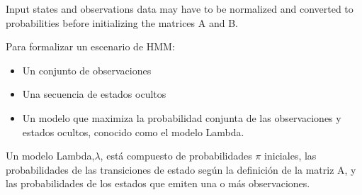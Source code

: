 Input states and observations data may have to be normalized and converted to probabilities before initializing the matrices A and B.




Para formalizar un escenario de HMM:

\begin{itemize}
	\item Un conjunto de observaciones
	\item Una secuencia de estados ocultos
	\item Un modelo que maximiza la probabilidad conjunta de las observaciones y estados ocultos, conocido como el modelo Lambda.

\end{itemize}


Un modelo Lambda,$\lambda$, está compuesto de probabilidades $\pi$ iniciales, las probabilidades de las transiciones de estado según la definición de la matriz A, y las probabilidades de los estados que emiten una o más observaciones.












